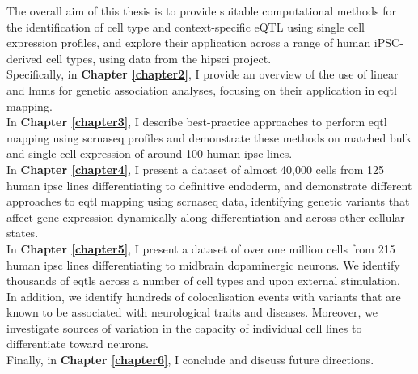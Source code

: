The overall aim of this thesis is to provide suitable computational methods for the identification of cell type and context-specific eQTL using single cell expression profiles, and explore their application across a range of human iPSC-derived cell types, using data from the \gls{hipsci} project.\\

Specifically, in \textbf{Chapter \ref{chapter2}}, I provide an overview of the use of linear and \glspl{lmm} for genetic association analyses, focusing on their application in \gls{eqtl} mapping.\\

In \textbf{Chapter \ref{chapter3}}, I describe best-practice approaches to perform \gls{eqtl} mapping using \gls{scrnaseq} profiles and demonstrate these methods on matched bulk and single cell expression of around 100 human \gls{ipsc} lines. \\

In \textbf{Chapter \ref{chapter4}}, I present a dataset of almost 40,000 cells from 125 human \gls{ipsc} lines differentiating to definitive endoderm, and demonstrate different approaches to \gls{eqtl} mapping using \gls{scrnaseq} data, identifying genetic variants that affect gene expression dynamically along differentiation and across other cellular states. \\

In \textbf{Chapter \ref{chapter5}}, I present a dataset of over one million cells from 215 human \gls{ipsc} lines differentiating to midbrain dopaminergic neurons.
We identify thousands of \glspl{eqtl} across a number of cell types and upon external stimulation.
In addition, we identify hundreds of colocalisation events with variants that are known to be associated with neurological traits and diseases.
Moreover, we investigate sources of variation in the capacity of individual cell lines to differentiate toward neurons.\\

Finally, in \textbf{Chapter \ref{chapter6}}, I conclude and discuss future directions.